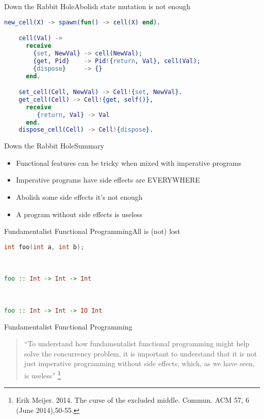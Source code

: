 \documentclass[rail]{beamer}
\begin{document}
\begin{frame}[fragile]{Down the Rabbit Hole}{Abolish state mutation is not enough}
  \begin{lstlisting}[language=erlang]
    new_cell(X) -> spawn(fun() -> cell(X) end).

    cell(Val) ->
      receive
        {set, NewVal} -> cell(NewVal);
        {get, Pid}    -> Pid!{return, Val}, cell(Val);
        {dispose}     -> {}
      end.

    set_cell(Cell, NewVal) -> Cell!{set, NewVal}.
    get_cell(Cell) -> Cell!{get, self()},
      receive
         {return, Val} -> Val
      end.
    dispose_cell(Cell) -> Cell!{dispose}.

  \end{lstlisting}
\end{frame}

\begin{frame}{Down the Rabbit Hole}{Summary}
  \begin{itemize}[<+->]
  \item Functional features can be tricky when mixed with imperative programs
  \item Imperative programs have side effects are EVERYWHERE
  \item Abolish some side effects it's not enough
  \item A program without side effects is useless
  \end{itemize}
\end{frame}

\begin{frame}[fragile]{Fundamentalist Functional Programming}{All is (not) lost}
  \begin{lstlisting}[language=C]
    int foo(int a, int b);
  \end{lstlisting}
  \pause
  \hfill\\
  \begin{lstlisting}[language=Haskell]
    foo :: Int -> Int -> Int
  \end{lstlisting}
  \pause
  \hfill\\
  \begin{lstlisting}[language=Haskell]
    foo :: Int -> Int -> IO Int
  \end{lstlisting}
\end{frame}

\begin{frame}{Fundamentalist Functional Programming}
  \begin{quote}
    ``To understand how fundamentalist functional programming might
    help solve the concurrency problem, it is important to understand
    that it is not just imperative programming without side effects,
    which, as we have seen, is useless''
    \footnote[frame,1] {Erik Meijer. 2014. The curse of the
      excluded middle. Commun. ACM 57, 6 (June 2014),50-55.}
  \end{quote}
\end{frame}
\end{document}

